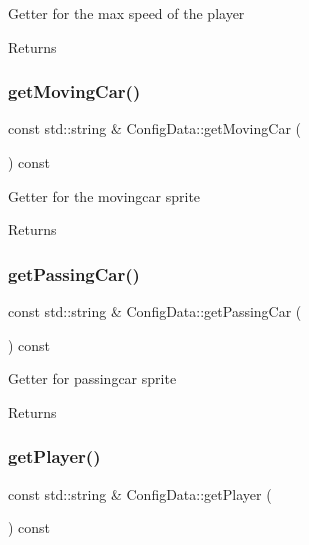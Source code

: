 Getter for the max speed of the player \begin{DoxyReturn}{Returns}

\end{DoxyReturn}
\mbox{\label{classConfigData_a79e097cdf1cc394818bb399cc4662176}} 
\subsubsection{\texorpdfstring{get\+Moving\+Car()}{getMovingCar()}}
{\footnotesize\ttfamily const std\+::string \& Config\+Data\+::get\+Moving\+Car (\begin{DoxyParamCaption}{ }\end{DoxyParamCaption}) const}

Getter for the movingcar sprite \begin{DoxyReturn}{Returns}

\end{DoxyReturn}
\mbox{\label{classConfigData_a5bc69646f744c91350126a83fe3a8199}} 
\subsubsection{\texorpdfstring{get\+Passing\+Car()}{getPassingCar()}}
{\footnotesize\ttfamily const std\+::string \& Config\+Data\+::get\+Passing\+Car (\begin{DoxyParamCaption}{ }\end{DoxyParamCaption}) const}

Getter for passingcar sprite \begin{DoxyReturn}{Returns}

\end{DoxyReturn}
\mbox{\label{classConfigData_a457424b879afddb0c95273e5ac16badd}} 
\subsubsection{\texorpdfstring{get\+Player()}{getPlayer()}}
{\footnotesize\ttfamily const std\+::string \& Config\+Data\+::get\+Player (\begin{DoxyParamCaption}{ }\end{DoxyParamCaption}) const}

